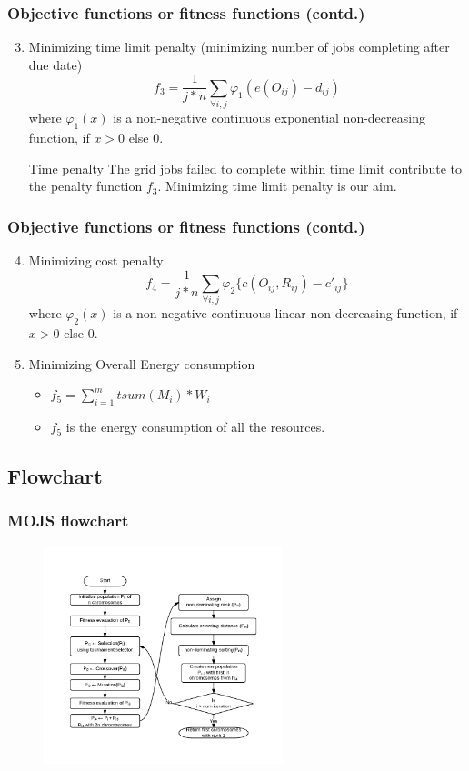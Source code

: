 \documentclass{beamer}
\begin{document}
\begin{frame}
\frametitle{Objective functions or fitness functions (contd.)}
\begin{enumerate}
  \setcounter{enumi}{2}
  \item Minimizing time limit penalty (minimizing number of jobs completing after due date)
$$
f_3 = \frac{1}{j*n}  \sum_{\forall i,j} \varphi _1 (e(O_{ij}) - d_{ij}) 
$$
where $\varphi _1(x)$ is a non-negative continuous exponential non-decreasing function, if $x > 0$ else $0$.
\begin{block}{Time penalty}
The grid jobs failed to complete within time limit contribute to the penalty function $f_3$. Minimizing time limit penalty is our aim.
\end{block}
\end{enumerate}
\end{frame}

\begin{frame}
\frametitle{Objective functions or fitness functions (contd.)}
\begin{enumerate}
  \setcounter{enumi}{3}
  \item Minimizing cost penalty 
$$
f_4 = \frac{1}{j*n}  \sum_{\forall i,j} \varphi _2 \{c(O_{ij},R_{ij}) - c'_{ij}\} 
$$
where $\varphi _2(x)$ is a non-negative continuous linear non-decreasing function, if $x > 0$ else $0$.
  \item Minimizing Overall Energy consumption
  \begin{itemize}
  \item $f_5 = \sum_{i=1}^{m} tsum(M_i) * W_i$
  \vspace{5pt}
  \item $f_5$ is the energy consumption of all the resources.
  \end{itemize}
\end{enumerate}
\end{frame}

\subsection*{Flowchart}
\begin{frame}
\frametitle{MOJS flowchart}
\begin{figure}[t]
\centering
\includegraphics[width=0.62\textwidth]{imgs/GA}
\end{figure}
\end{frame}
\end{document}
